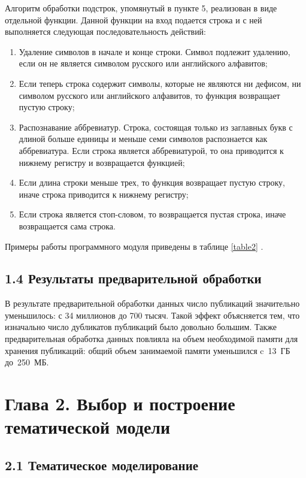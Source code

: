 \documentclass[a4paper]{report}
\begin{document}
	Алгоритм обработки подстрок, упомянутый в пункте 5, реализован в виде отдельной функции. Данной функции на вход подается строка и с ней выполняется следующая последовательность действий:
	\begin{enumerate}
	\item{ Удаление символов в начале и конце строки. Символ подлежит удалению, если он не является символом русского или английского алфавитов;}
	
	\item{ Если теперь строка содержит символы, которые не являются ни дефисом, ни символом русского или английского алфавитов, то функция возвращает пустую строку; }
	
	\item{ Распознавание аббревиатур. Строка, состоящая только из заглавных букв с длиной больше единицы и меньше семи символов распознается как аббревиатура. Если строка является аббревиатурой, то она приводится к нижнему регистру и возвращается функцией;}
	
	\item{ Если длина строки меньше трех, то функция возвращает пустую строку, иначе строка приводится к нижнему регистру; }
	
	\item{ Если строка является стоп-словом, то возвращается пустая строка, иначе возвращается сама строка.}
	\end{enumerate}
	
	Примеры работы программного модуля приведены в таблице \ref{table2} .
	

	\subsection{1.4 Результаты предварительной обработки} 
	
	В результате предварительной обработки данных число публикаций значительно уменьшилось: с 34 миллионов до 700 тысяч. Такой эффект объясняется тем, что изначально число дубликатов публикаций было довольно большим. Также предварительная обработка данных повлияла на объем необходимой памяти для хранения публикаций: общий объем занимаемой памяти уменьшился c~13~ГБ до~250~МБ.
	
	\newpage
	\section{Глава 2. Выбор и построение тематической модели}
	\subsection{2.1 Тематическое моделирование}
\end{document}
